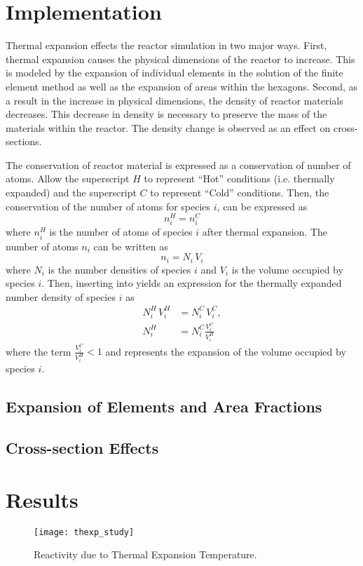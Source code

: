   
  


\section{Implementation}
  Thermal expansion effects the reactor simulation in two major ways. First,
  thermal expansion causes the physical dimensions of the reactor to increase. 
  This is modeled by the expansion of individual elements in the solution of the
  finite element method as well as the expansion of areas within the hexagons.
  Second, as a result in the increase in physical dimensions, the density of
  reactor materials decreases. This decrease in density is necessary to preserve
  the mass of the materials within the reactor. The density change is observed
  as an effect on cross-sections.

  The conservation of reactor material is expressed as a conservation of number
  of atoms. Allow the superscript $H$ to represent ``Hot'' conditions (i.e.
  thermally expanded) and the superscript $C$ to represent ``Cold'' conditions.
  Then, the conservation of the number of atoms for species $i$, can be
  expressed as
  \begin{equation}
    \label{eq:conservation}
    n_i^H = n_i^C 
  \end{equation}
  where $n_i^H$ is the number of atoms of species $i$ after thermal expansion.
  The number of atoms $n_i$ can be written as 
  \begin{equation}
    \label{eq:nden_definition}
    n_i = N_i \, V_i
  \end{equation}
  where $N_i$ is the number densities of species $i$ and $V_i$ is the volume
  occupied by species $i$. Then, inserting  into 
   yields an expression for the thermally expanded number
  density of species $i$ as
  \begin{align}
    N_i^H \, V_i^H &= N_i^C \, V_i^C, \\
    N_i^H &= N_i^C \frac{V_i^C}{V_i^H}
  \end{align}
  where the term $\frac{V_i^C}{V_i^H} < 1$ and represents the expansion of the
  volume occupied by species $i$.

  \subsection{Expansion of Elements and Area Fractions}
    

  \subsection{Cross-section Effects}

\section{Results}
  \begin{figure}
    \centering
    \texttt{[image: thexp\_study]}
    \caption{Reactivity due to Thermal Expansion Temperature.}
    \label{fig:thexp_study}
  \end{figure}


